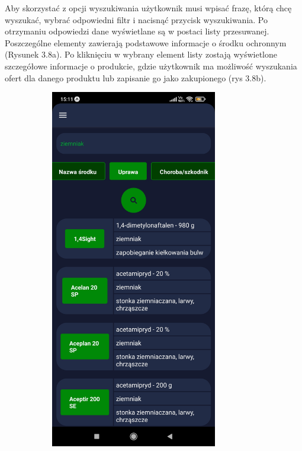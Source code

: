 \documentclass[a4paper,12pt,oneside]{book}
\begin{document}
		Aby skorzystać z opcji wyszukiwania użytkownik musi wpisać frazę, którą chcę wyszukać, wybrać odpowiedni filtr i nacisnąć przycisk wyszukiwania. Po otrzymaniu odpowiedzi dane wyświetlane są w postaci listy przesuwanej. Poszczególne elementy zawierają podstawowe informacje o środku ochronnym (Rysunek 3.8a). Po kliknięciu w wybrany element listy zostają wyświetlone szczegółowe informacje o produkcie, gdzie użytkownik ma możliwość wyszukania ofert dla danego produktu lub zapisanie go jako zakupionego (rys 3.8b).
		
		\begin{figure}[H]
			\centering
			\begin{subfigure}{.5\textwidth}
				\centering
				\includegraphics[width=0.8\textwidth]{grafika/wysz_a.jpg}

\end{subfigure}
\end{figure}
\end{document}
